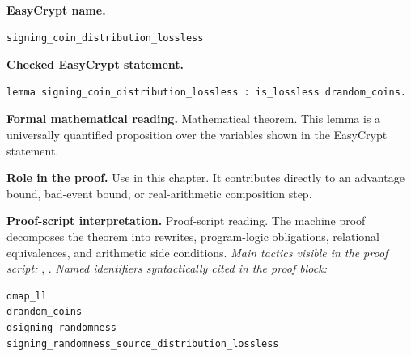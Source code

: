 \begin{formaltheorem}
\noindent\textbf{EasyCrypt name.}
\begin{lstlisting}[language=EasyCrypt,basicstyle=\ttfamily\scriptsize]
signing_coin_distribution_lossless
\end{lstlisting}
\noindent\textbf{Checked EasyCrypt statement.}
\begin{lstlisting}[language=EasyCrypt,basicstyle=\ttfamily\scriptsize]
lemma signing_coin_distribution_lossless : is_lossless drandom_coins.
\end{lstlisting}
\noindent\textbf{Formal mathematical reading.}
Mathematical theorem. This lemma is a universally quantified proposition over the variables shown in the EasyCrypt statement.

\noindent\textbf{Role in the proof.}
Use in this chapter. It contributes directly to an advantage bound, bad-event bound, or real-arithmetic composition step.

\noindent\textbf{Proof-script interpretation.}
Proof-script reading. The machine proof decomposes the theorem into rewrites, program-logic obligations, relational equivalences, and arithmetic side conditions.
\emph{Main tactics visible in the proof script:} , .
\emph{Named identifiers syntactically cited in the proof block:}
\begin{lstlisting}[language=EasyCrypt,basicstyle=\ttfamily\scriptsize]
dmap_ll
drandom_coins
dsigning_randomness
signing_randomness_source_distribution_lossless
\end{lstlisting}

\end{formaltheorem}

